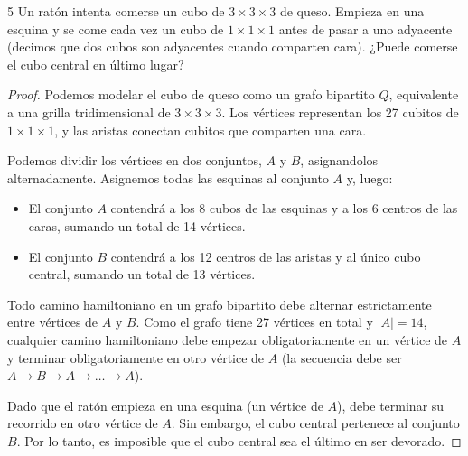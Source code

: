 \begin{ejercicioEntregar}{5}
    Un ratón intenta comerse un cubo de \( 3 \times 3 \times 3 \) de queso. Empieza en una esquina y se come cada vez un cubo de \( 1 \times 1 \times 1 \) antes de pasar a uno adyacente (decimos que dos cubos son adyacentes cuando comparten cara). ¿Puede comerse el cubo central en último lugar?
\end{ejercicioEntregar}
\begin{proof}
    Podemos modelar el cubo de queso como un grafo bipartito \(Q\), equivalente a una grilla tridimensional de \(3 \times 3 \times 3\). Los vértices representan los 27 cubitos de \(1 \times 1 \times 1\), y las aristas conectan cubitos que comparten una cara.

    Podemos dividir los vértices en dos conjuntos, \(A\) y \(B\), asignandolos alternadamente. Asignemos todas las esquinas al conjunto \( A \) y, luego:
    \begin{itemize}
        \item El conjunto \(A\) contendrá a los 8 cubos de las esquinas y a los 6 centros de las caras, sumando un total de 14 vértices.
        \item El conjunto \(B\) contendrá a los 12 centros de las aristas y al único cubo central, sumando un total de 13 vértices.
    \end{itemize}

    Todo camino hamiltoniano en un grafo bipartito debe alternar estrictamente entre vértices de \(A\) y \(B\). Como el grafo tiene 27 vértices en total y \(|A| = 14\), cualquier camino hamiltoniano debe empezar obligatoriamente en un vértice de \(A\) y terminar obligatoriamente en otro vértice de \(A\) (la secuencia debe ser \(A \to B \to A \to \dots \to A\)).

    Dado que el ratón empieza en una esquina (un vértice de \(A\)), debe terminar su recorrido en otro vértice de \(A\). Sin embargo, el cubo central pertenece al conjunto \(B\). Por lo tanto, es imposible que el cubo central sea el último en ser devorado.
\end{proof}

\vspace{0.5cm}

